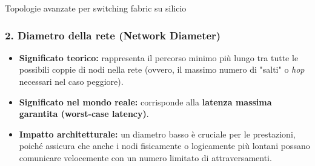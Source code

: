 \documentclass[a4paper,12pt]{report}
\begin{document}
\begin{notebox}{Topologie avanzate per switching fabric su silicio}
\subsubsection*{2. Diametro della rete (Network Diameter)}
\begin{itemize}
    \item \textbf{Significato teorico:} rappresenta il percorso minimo più lungo tra tutte le possibili coppie di nodi nella rete (ovvero, il massimo numero di "salti" o \emph{hop} necessari nel caso peggiore).
    \item \textbf{Significato nel mondo reale:} corrisponde alla \textbf{latenza massima garantita (worst-case latency)}.
    \item \textbf{Impatto architetturale:} un diametro basso è cruciale per le prestazioni, poiché assicura che anche i nodi fisicamente o logicamente più lontani possano comunicare velocemente con un numero limitato di attraversamenti.
\end{itemize}


\end{notebox}


\newpage
\end{document}
